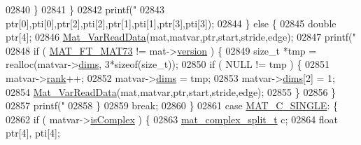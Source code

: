 \begin{DoxyCode}
{{{{{{{{{02840                             \}
02841                         \}
02842                         printf(\textcolor{stringliteral}{"%
02843                             ptr[0],pti[0],ptr[2],pti[2],ptr[1],pti[1],ptr[3],pti[3]);
02844                     \} \textcolor{keywordflow}{else} \{
02845                         \textcolor{keywordtype}{double} ptr[4];
02846                         \hyperlink{group___m_a_t_ga1845000f4fc6252ec5ff11c4b9f0759f}{Mat\_VarReadData}(mat,matvar,ptr,start,stride,edge);
02847                         printf(\textcolor{stringliteral}{"%
02848                         \textcolor{keywordflow}{if} ( \hyperlink{group___m_a_t_ggad03442b8378999189d510e3745c702b7a765c5d1d5038947646260dc82483517e}{MAT\_FT\_MAT73} != mat->\hyperlink{struct__mat__t_a729c2bc0afc97485057a5af425635b1a}{version} ) \{
02849                             \textcolor{keywordtype}{size\_t} *tmp = realloc(matvar->\hyperlink{group___m_a_t_a8e01234e1c862ce3472bb37f5a09b92c}{dims}, 3*\textcolor{keyword}{sizeof}(\textcolor{keywordtype}{size\_t}));
02850                             \textcolor{keywordflow}{if} ( NULL != tmp ) \{
02851                                 matvar->\hyperlink{group___m_a_t_a84ba70c96ded13cc555fa75b768d9921}{rank}++;
02852                                 matvar->\hyperlink{group___m_a_t_a8e01234e1c862ce3472bb37f5a09b92c}{dims} = tmp;
02853                                 matvar->\hyperlink{group___m_a_t_a8e01234e1c862ce3472bb37f5a09b92c}{dims}[2] = 1;
02854                                 \hyperlink{group___m_a_t_ga1845000f4fc6252ec5ff11c4b9f0759f}{Mat\_VarReadData}(mat,matvar,ptr,start,stride,edge);
02855                             \}
02856                         \}
02857                         printf(\textcolor{stringliteral}{"%
02858                     \}
02859                     \textcolor{keywordflow}{break};
02860                 \}
02861                 \textcolor{keywordflow}{case} \hyperlink{group___m_a_t_ggad4d60ae7b709fc81bfd744fb4c857c40a2825631e26a961cbe0f79db50a39cea2}{MAT\_C\_SINGLE}: \{
02862                     \textcolor{keywordflow}{if} ( matvar->\hyperlink{group___m_a_t_aeb03b3a69f108dc05470b00443a43739}{isComplex} ) \{
02863                         \hyperlink{group___m_a_t_structmat__complex__split__t}{mat\_complex\_split\_t} c;
02864                         \textcolor{keywordtype}{float} ptr[4], pti[4];
}}}}}}}}}}}}
\end{DoxyCode}
